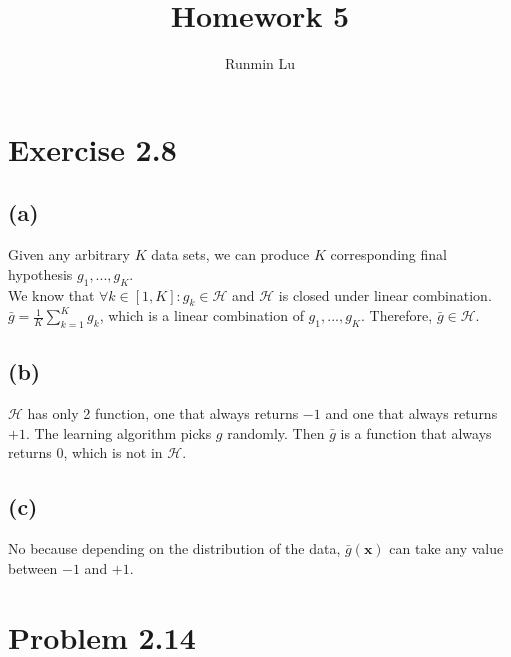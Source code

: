 \documentclass{article}
\title{Homework 5}
\author{Runmin Lu}
\begin{document}
	\maketitle
	
	\section*{Exercise 2.8}
	\subsection*{(a)}
		Given any arbitrary $K$ data sets, we can produce $K$ corresponding final hypothesis $g_1, ..., g_K$.\\
		We know that $\forall k \in [1, K]: g_k \in \mathcal H$ and $\mathcal H$ is closed under linear combination.\\
		$\bar g = \frac1K \sum\limits_{k=1}^K g_k$, which is a linear combination of $g_1,...,g_K$. Therefore, $\bar g \in \mathcal H$.
		
	\subsection*{(b)}
		$\mathcal H$ has only 2 function, one that always returns $-1$ and one that always returns $+1$. The learning algorithm picks $g$ randomly. Then $\bar g$ is a function that always returns 0, which is not in $\mathcal H$.
		
	\subsection*{(c)}
		No because depending on the distribution of the data, $\bar g(\mathbf x)$ can take any value between $-1$ and $+1$.
		
	\section*{Problem 2.14}
\end{document}
